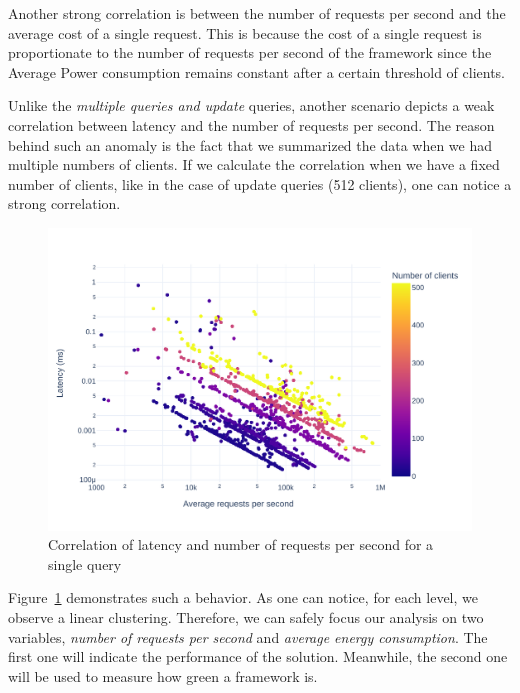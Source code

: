 Another strong correlation is between the number of requests per second and the average cost of a single request.
This is because the cost of a single request is proportionate to the number of requests per second of the framework since the Average Power consumption remains constant after a certain threshold of clients.

Unlike the \emph{multiple queries and update} queries, another scenario depicts a weak correlation between latency and the number of requests per second.
The reason behind such an anomaly is the fact that we summarized the data when we had multiple numbers of clients.
If we calculate the correlation when we have a fixed number of clients, like in the case of update queries (512 clients), one can notice a strong correlation.

\begin{figure}[bht]
    \centering
    \includegraphics[width=.9\columnwidth ]{imgs/scatter_db_latency_rps}
    \caption{Correlation of latency and number of requests per second for a single query}
    \label{fig:scatter_db}
\end{figure}

Figure~\ref{fig:scatter_db} demonstrates such a behavior.
As one can notice, for each level, we observe a linear clustering.
Therefore, we can safely focus our analysis on two variables, \emph{number of requests per second} and \emph{average energy consumption}.
The first one will indicate the performance of the solution. Meanwhile, the second one will be used to measure how green a framework is.

